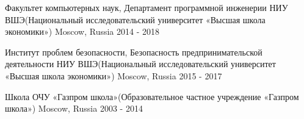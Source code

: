 



\cventryeducation
{Факультет компьютерных наук, Департамент программной инженерии} %
{НИУ ВШЭ(Национальный исследовательский университет «Высшая школа экономики»)} %
{Moscow, Russia} %
{2014 - 2018} %

\cventryeducation
{Институт проблем безопасности, Безопасность предпринимательской деятельности} %
{НИУ ВШЭ(Национальный исследовательский университет «Высшая школа экономики»)} %
{Moscow, Russia} %
{2015 - 2017} %

\cventryeducation
{Школа} %
{ОЧУ «Газпром школа»(Образовательное частное учреждение «Газпром школа»)} %
{Moscow, Russia} %
{2003 - 2014} %


